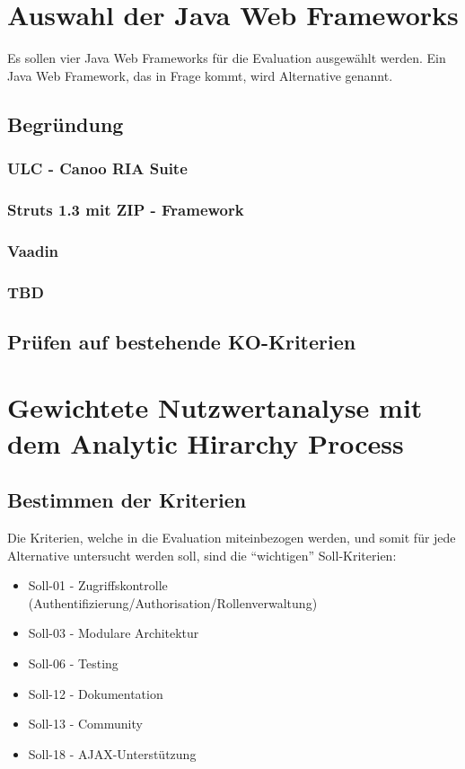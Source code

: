   \section{Auswahl der Java Web Frameworks}
  
  Es sollen vier Java Web Frameworks für die Evaluation ausgewählt werden. Ein
  Java Web Framework, das in Frage kommt, wird Alternative genannt.
  
  \subsection{Begründung}
  
  \subsubsection{ULC - Canoo RIA Suite}
  
  \subsubsection{Struts 1.3 mit ZIP - Framework}
  
  \subsubsection{Vaadin}
  
  \subsubsection{TBD}  
  
  \subsection{Prüfen auf bestehende KO-Kriterien}
  
  \section{Gewichtete Nutzwertanalyse mit dem Analytic Hirarchy Process}
  
  \subsection{Bestimmen der Kriterien}
  
  Die Kriterien, welche in die Evaluation miteinbezogen werden, und somit für
  jede Alternative untersucht werden soll, sind die ``wichtigen''
  Soll-Kriterien:
  
  \begin{itemize}
    \item Soll-01 - Zugriffskontrolle 
    (Authentifizierung/Authorisation/Rollenverwaltung)
    \item Soll-03 - Modulare Architektur
    \item Soll-06 - Testing
    \item Soll-12 - Dokumentation
    \item Soll-13 - Community
    \item Soll-18 - AJAX-Unterstützung
  \end{itemize}
  
